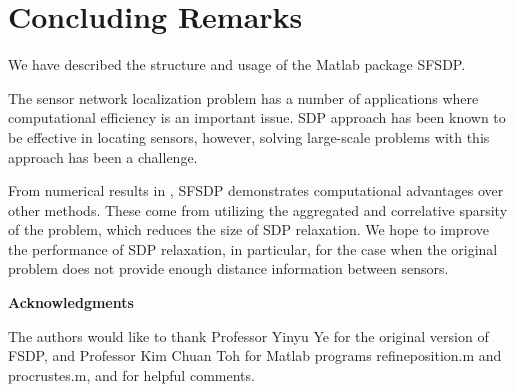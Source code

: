 \documentclass[12pt]{article}
\begin{document}
\section{Concluding Remarks}

We have described the structure and usage of the Matlab package SFSDP.

The sensor network localization problem has a number of applications where
computational efficiency is an important issue. SDP approach has been known
to be effective in locating sensors, however,  solving large-scale
problems with this approach has been a challenge.

From numerical results in \cite{KIM08},
SFSDP demonstrates computational advantages over other methods.
These come from utilizing the aggregated and
correlative sparsity of the problem, which reduces the size of SDP relaxation.
We hope to improve the performance of SDP relaxation, in particular, for the case when
the original problem does not provide enough distance information between sensors.

\vspace{1cm}
\noindent
{\bf {\large Acknowledgments}}

\noindent
The authors would like to thank  Professor Yinyu Ye
 for the original version of FSDP, and Professor Kim Chuan Toh 
 for  Matlab programs refineposition.m  and procrustes.m, and for helpful comments. 
\end{document}
